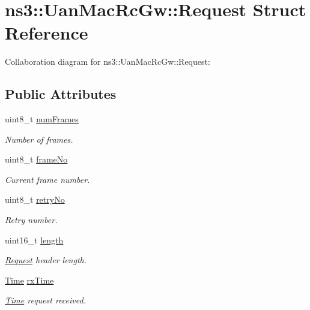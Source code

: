 \hypertarget{structns3_1_1UanMacRcGw_1_1Request}{}\section{ns3\+:\+:Uan\+Mac\+Rc\+Gw\+:\+:Request Struct Reference}
\label{structns3_1_1UanMacRcGw_1_1Request}


Collaboration diagram for ns3\+:\+:Uan\+Mac\+Rc\+Gw\+:\+:Request\+:
\subsection*{Public Attributes}
\begin{DoxyCompactItemize}
\item 
uint8\+\_\+t \hyperlink{structns3_1_1UanMacRcGw_1_1Request_aa85e318edd82745cb5b6d844717b4d50}{num\+Frames}
\begin{DoxyCompactList}\small\item\em Number of frames. \end{DoxyCompactList}\item 
uint8\+\_\+t \hyperlink{structns3_1_1UanMacRcGw_1_1Request_aa4b2c7061c5f9823430e8fbccfaecc1a}{frame\+No}
\begin{DoxyCompactList}\small\item\em Current frame number. \end{DoxyCompactList}\item 
uint8\+\_\+t \hyperlink{structns3_1_1UanMacRcGw_1_1Request_a1e555c7b772f40d377d7ea9966cf345b}{retry\+No}
\begin{DoxyCompactList}\small\item\em Retry number. \end{DoxyCompactList}\item 
uint16\+\_\+t \hyperlink{structns3_1_1UanMacRcGw_1_1Request_a959b7215687070780714f08f0bb266b0}{length}
\begin{DoxyCompactList}\small\item\em \hyperlink{structns3_1_1UanMacRcGw_1_1Request}{Request} header length. \end{DoxyCompactList}\item 
\hyperlink{classns3_1_1Time}{Time} \hyperlink{structns3_1_1UanMacRcGw_1_1Request_ac537cd047223958f5dc11b18fdf97457}{rx\+Time}
\begin{DoxyCompactList}\small\item\em \hyperlink{classns3_1_1Time}{Time} request received. \end{DoxyCompactList}\end{DoxyCompactItemize}


